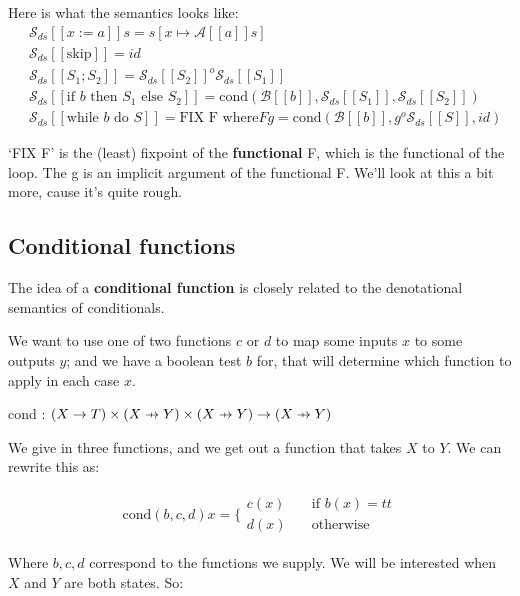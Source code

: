 \documentclass[11pt,a4paper,titlepage,dvipsnames,cmyk]{scrartcl}
\newcommand\pfun{\mathrel{\ooalign{\hfil$\mapstochar\mkern5mu$\hfil\cr$\to$\cr}}}
\begin{document}
Here is what the semantics looks like:
\begin{align*}
    &\mathcal{S}_{ds} [\![x:=a]\!] s = s[x \mapsto \mathcal{A}[\![a]\!]s]
    \\
    &\mathcal{S}_{ds}[\![\text{skip}]\!] = id \\
    &\mathcal{S}_{ds}[\![S_1;S_2]\!] =
    \mathcal{S}_{ds}[\![S_2]\!]^o\mathcal{S}_{ds}[\![S_1]\!] \\
    &\mathcal{S}_{ds}[\![\text{if } b \text{ then } S_1 \text{ else }
    S_2]\!] =
    \text{cond}(\mathcal{B}[\![b]\!],\mathcal{S}_{ds}[\![S_1]\!],\mathcal{S}_{ds}[\![S_2]\!]) \\
    &\mathcal{S}_{ds}[\![\text{while } b \text{ do } S]\!] = \text{FIX F
    where} F g =
    \text{cond}(\mathcal{B}[\![b]\!],g^o\mathcal{S}_{ds}[\![S]\!],id)
\end{align*}

`FIX F' is the (least) fixpoint of the \textbf{functional} F, which is the
functional of the loop. The g is an implicit argument of the functional F.
We'll look at this a bit more, cause it's quite rough.

\subsection{Conditional functions}%
\label{sub:conditional-func}
The idea of a \textbf{conditional function} is closely related to the
denotational semantics of conditionals.

We want to use one of two functions $c$ or $d$ to map some inputs $x$ to
some outputs $y$; and we have a boolean test $b$ for, that will determine
which function to apply in each case $x$.

\begin{center}
cond : $(X \rightarrow T) \times (X \pfun Y) \times (X \pfun Y)
\rightarrow (X \pfun Y)$
\end{center}

We give in three functions, and we get out a function that takes $X$ to
$Y$. We can rewrite this as:

\begin{align*}
    \text{cond}(b,c,d)x = \Bigg \{
        \begin{split}
            c(x) \quad &\text{if } b(x) = tt \\
            d(x) \quad &\text{otherwise}
        \end{split}
\end{align*}

Where $b, c, d$ correspond to the functions we supply. We will be
interested when $X$ and $Y$ are both states. So:
\end{document}
